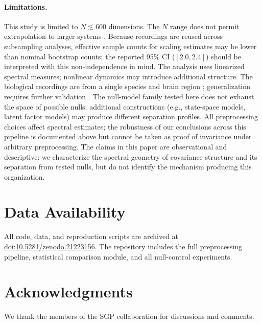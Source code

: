 \documentclass[aps,pre,reprint,twocolumn]{revtex4-2}
\newcommand{\mec}{\text{MEC}}
\begin{document}
\paragraph{Limitations.}
This study is limited to $N \lesssim 600$ dimensions. The $N$ range does not permit extrapolation to larger systems \cite{goldenfeld1992}. Because recordings are reused across subsampling analyses, effective sample counts for scaling estimates may be lower than nominal bootstrap counts; the reported 95\% CI ($[2.0, 2.4]$) should be interpreted with this non-independence in mind. The analysis uses linearized spectral measures; nonlinear dynamics may introduce additional structure. The biological recordings are from a single species and brain region \cite{gardner2022,stringer2019}; generalization requires further validation \cite{cunningham2014}. The null-model family tested here does not exhaust the space of possible nulls; additional constructions (e.g., state-space models, latent factor models) may produce different separation profiles. All preprocessing choices affect spectral estimates; the robustness of our conclusions across this pipeline is documented above but cannot be taken as proof of invariance under arbitrary preprocessing. The claims in this paper are observational and descriptive: we characterize the spectral geometry of \mec{} covariance structure and its separation from tested nulls, but do not identify the mechanism producing this organization.

\section*{Data Availability}

All code, data, and reproduction scripts are archived at \href{https://doi.org/10.5281/zenodo.21223156}{doi:10.5281/zenodo.21223156}. The repository includes the full preprocessing pipeline, statistical comparison module, and all null-control experiments.

\section*{Acknowledgments}

We thank the members of the SGP collaboration for discussions and comments.


\end{document}
